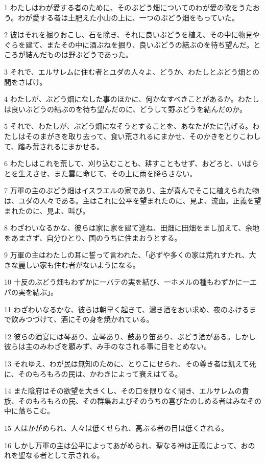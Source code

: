 \par 1 わたしはわが愛する者のために、そのぶどう畑についてのわが愛の歌をうたおう。わが愛する者は土肥えた小山の上に、一つのぶどう畑をもっていた。
\par 2 彼はそれを掘りおこし、石を除き、それに良いぶどうを植え、その中に物見やぐらを建て、またその中に酒ぶねを掘り、良いぶどうの結ぶのを待ち望んだ。ところが結んだものは野ぶどうであった。
\par 3 それで、エルサレムに住む者とユダの人々よ、どうか、わたしとぶどう畑との間をさばけ。
\par 4 わたしが、ぶどう畑になした事のほかに、何かなすべきことがあるか。わたしは良いぶどうの結ぶのを待ち望んだのに、どうして野ぶどうを結んだのか。
\par 5 それで、わたしが、ぶどう畑になそうとすることを、あなたがたに告げる。わたしはそのまがきを取り去って、食い荒されるにまかせ、そのかきをとりこわして、踏み荒されるにまかせる。
\par 6 わたしはこれを荒して、刈り込むことも、耕すこともせず、おどろと、いばらとを生えさせ、また雲に命じて、その上に雨を降らさない。
\par 7 万軍の主のぶどう畑はイスラエルの家であり、主が喜んでそこに植えられた物は、ユダの人々である。主はこれに公平を望まれたのに、見よ、流血。正義を望まれたのに、見よ、叫び。
\par 8 わざわいなるかな、彼らは家に家を建て連ね、田畑に田畑をまし加えて、余地をあまさず、自分ひとり、国のうちに住まおうとする。
\par 9 万軍の主はわたしの耳に誓って言われた、「必ずや多くの家は荒れすたれ、大きな麗しい家も住む者がないようになる。
\par 10 十反のぶどう畑もわずかに一バテの実を結び、一ホメルの種もわずかに一エパの実を結ぶ」。
\par 11 わざわいなるかな、彼らは朝早く起きて、濃き酒をおい求め、夜のふけるまで飲みつづけて、酒にその身を焼かれている。
\par 12 彼らの酒宴には琴あり、立琴あり、鼓あり笛あり、ぶどう酒がある。しかし彼らは主のみわざを顧みず、み手のなされる事に目をとめない。
\par 13 それゆえ、わが民は無知のために、とりこにせられ、その尊き者は飢えて死に、そのもろもろの民は、かわきによって衰えはてる。
\par 14 また陰府はその欲望を大きくし、その口を限りなく開き、エルサレムの貴族、そのもろもろの民、その群集およびそのうちの喜びたのしめる者はみなその中に落ちこむ。
\par 15 人はかがめられ、人々は低くせられ、高ぶる者の目は低くされる。
\par 16 しかし万軍の主は公平によってあがめられ、聖なる神は正義によって、おのれを聖なる者として示される。
